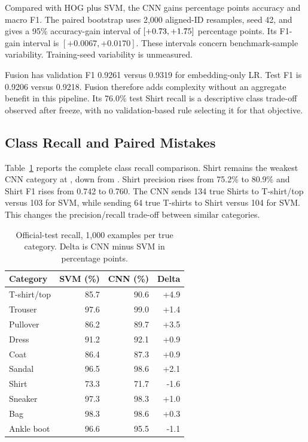 \documentclass[conference]{IEEEtran}
\begin{document}
Compared with HOG plus SVM, the CNN gains \AccuracyGain{} percentage points
accuracy and \FoneGain{} macro F1. The paired bootstrap uses 2,000 aligned-ID
resamples, seed 42, and gives a 95\% accuracy-gain interval of
$[+0.73{},+1.75{}]$ percentage points. Its F1-gain interval is
$[+0.0067,+0.0170]$. These intervals concern benchmark-sample variability.
Training-seed variability is unmeasured.

Fusion has validation F1 0.9261 versus 0.9319 for embedding-only LR. Test F1
is 0.9206 versus 0.9218. Fusion therefore adds complexity without an aggregate
benefit in this pipeline. Its 76.0\% test Shirt recall is a descriptive class
trade-off observed after freeze, with no validation-based rule selecting it
for that objective.

\subsection{Class Recall and Paired Mistakes}
Table~\ref{tab:recall} reports the complete class recall comparison. Shirt
remains the weakest CNN category at \CnnShirt{}, down from \SvmShirt{}.
Shirt precision rises from 75.2\% to 80.9\% and Shirt F1 rises from 0.742 to
0.760. The CNN sends 134 true Shirts to T-shirt/top versus 103 for SVM, while
sending 64 true T-shirts to Shirt versus 104 for SVM. This changes the
precision/recall trade-off between similar categories.

\begin{table}[t]
\caption{Official-test recall, 1,000 examples per true category. Delta is CNN
minus SVM in percentage points.}
\label{tab:recall}
\centering\small
\begin{tabular}{lrrr}
\toprule
Category & SVM (\%) & CNN (\%) & Delta\\
\midrule
T-shirt/top & 85.7 & 90.6 & +4.9 \\
Trouser & 97.6 & 99.0 & +1.4 \\
Pullover & 86.2 & 89.7 & +3.5 \\
Dress & 91.2 & 92.1 & +0.9 \\
Coat & 86.4 & 87.3 & +0.9 \\
Sandal & 96.5 & 98.6 & +2.1 \\
Shirt & 73.3 & 71.7 & -1.6 \\
Sneaker & 97.3 & 98.3 & +1.0 \\
Bag & 98.3 & 98.6 & +0.3 \\
Ankle boot & 96.6 & 95.5 & -1.1 \\
\bottomrule
\end{tabular}
\end{table}
\end{document}
